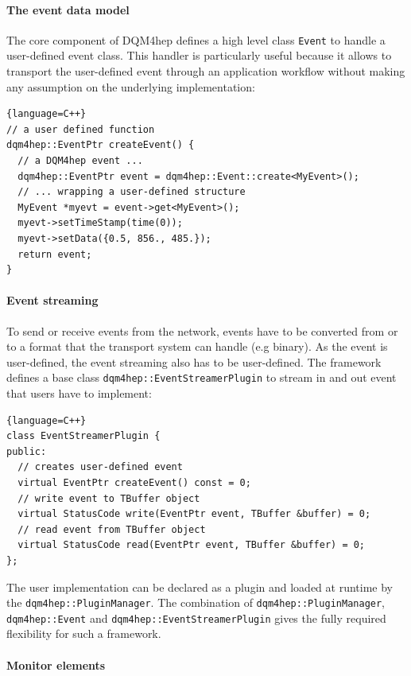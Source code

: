 \documentclass{webofc}
\begin{document}
\paragraph{The event data model}

The core component of DQM4hep defines a high level class \texttt{Event} to handle a user-defined event class.
This handler is particularly useful because it allows to transport the user-defined event through an application
workflow without making any assumption on the underlying implementation:

\begin{lstlisting}{language=C++}
// a user defined function
dqm4hep::EventPtr createEvent() {
  // a DQM4hep event ...
  dqm4hep::EventPtr event = dqm4hep::Event::create<MyEvent>();
  // ... wrapping a user-defined structure
  MyEvent *myevt = event->get<MyEvent>();
  myevt->setTimeStamp(time(0));
  myevt->setData({0.5, 856., 485.});
  return event;
}
\end{lstlisting}

\paragraph{Event streaming}

To send or receive events from the network, events have to be converted from or to a format that the transport system can handle (e.g binary). 
As the event is user-defined, the event streaming also has to be user-defined. 
The framework defines a base class \texttt{dqm4hep::EventStreamerPlugin} to stream in and out event that users have to implement:

\begin{lstlisting}{language=C++}
class EventStreamerPlugin {
public:
  // creates user-defined event
  virtual EventPtr createEvent() const = 0;
  // write event to TBuffer object
  virtual StatusCode write(EventPtr event, TBuffer &buffer) = 0;
  // read event from TBuffer object
  virtual StatusCode read(EventPtr event, TBuffer &buffer) = 0;
};
\end{lstlisting}

The user implementation can be declared as a plugin and loaded at runtime by the \texttt{dqm4hep::PluginManager}. 
The combination of \texttt{dqm4hep::PluginManager}, \texttt{dqm4hep::Event} and \texttt{dqm4hep::EventStreamerPlugin} gives the 
fully required flexibility for such a framework. 

\paragraph{Monitor elements}
\end{document}
